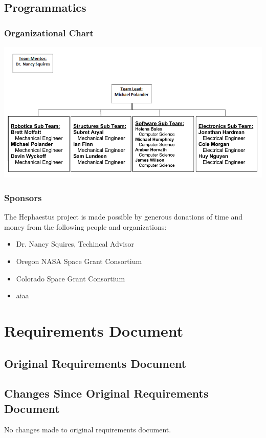 \documentclass[letterpaper,10pt]{article}
\begin{document}
\subsection{Programmatics}
\subsubsection{Organizational Chart}
\includegraphics[width=\textwidth]{./images/orgChart.png}

\subsubsection{Sponsors}
The Hephaestus project is made possible by generous donations of time and money
from the following people and organizations:
\begin{itemize}
  \item{Dr. Nancy Squires, Techincal Advisor}
  \item{Oregon NASA Space Grant Consortium}
  \item{Colorado Space Grant Consortium}
  \item{\gls{aiaa}}
\end{itemize}

\section{Requirements Document}
\subsection{Original Requirements Document}


\subsection{Changes Since Original Requirements Document}
No changes made to original requirements document.
\end{document}
